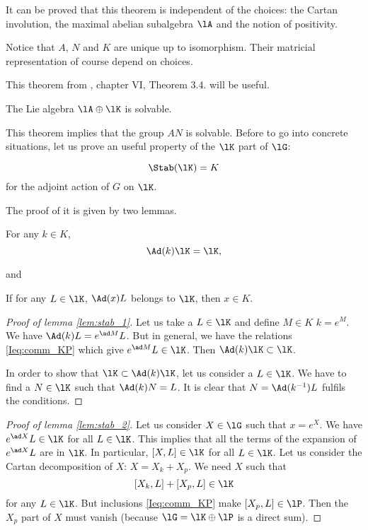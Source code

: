 \begin{remark}
It can be proved that this theorem is independent of the choices: the Cartan involution, the maximal abelian subalgebra $\lA$ and the notion of positivity.
\end{remark} 
Notice that $A$, $N$ and $K$ are unique up to isomorphism. Their matricial representation of course depend on choices.

This theorem from \cite{Helgason}, chapter VI, Theorem 3.4. will be useful.

\begin{theorem}
The Lie algebra $\lA\oplus\lK$ is solvable.
\end{theorem}
This theorem implies that the group $AN$ is solvable. Before to go into concrete situations, let us prove an useful property of the $\lK$ part of $\lG$:

\begin{theorem}
\[
      \Stab(\lK)=K
\]
 for the adjoint action of $G$ on $\lK$.
\label{tho:Stab_K}
\end{theorem}
The proof of it is given by two lemmas. \cite{Humphreys}

\begin{lemma}
For any $k\in K$,
\[
   \Ad(k)\lK=\lK,
\]
\label{lem:stab_1}
\end{lemma}
and
\begin{lemma}
 If for any $L\in\lK$, $\Ad(x)L$ belongs to $\lK$, then $x\in K$.
\label{lem:stab_2}
\end{lemma}

\begin{proof}[Proof of lemma \ref{lem:stab_1}]
   Let us take a $L\in\lK$ and define $M\in K$ $k=e^M$. We have $\Ad(k)L=e^{\ad M}L$. But in general, we have the relations \eqref{Ieq:comm_KP} which give $e^{\ad M}L\in\lK$. Then $\Ad(k)\lK\subset\lK$.

   In order to show that $\lK\subset\Ad(k)\lK$, let us consider a $L\in\lK$. We have to find a $N\in\lK$ such that $\Ad(k)N=L$. It is clear that $N=\Ad(k^{-1})L$ fulfils the conditions.
\end{proof}

\begin{proof}[Proof of lemma \ref{lem:stab_2}]
Let us consider $X\in\lG$ such that $x=e^X$. We have $e^{\ad X}L\in\lK$ for all $L\in\lK$. This implies that all the terms of the expansion of $e^{\ad X}L$ are in $\lK$. In particular, $[X,L]\in\lK$ for all $L\in\lK$. Let us consider the Cartan decomposition of $X$: $X=X_k+X_p$. We need $X$ such that
\[
   [X_k,L]+[X_p,L]\in\lK
\]
for any $L\in\lK$. But inclusions \eqref{Ieq:comm_KP} make $[X_p,L]\in\lP$. Then the $X_p$ part of $X$ must vanish (because $\lG=\lK\oplus\lP$ is a direct sum).
\end{proof}

